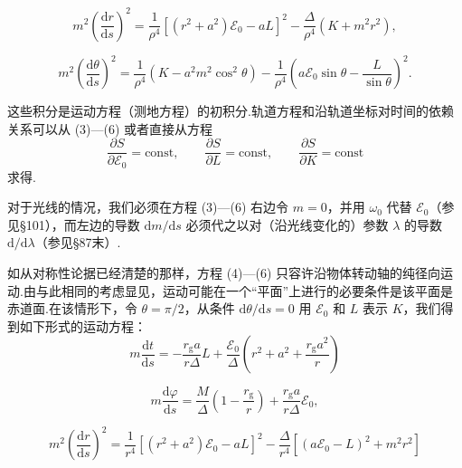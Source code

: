 \begin{xiti}
\begin{equation}
  m^{2}\left(\frac{\mathrm{d}r}{\mathrm{d}s}\right)^{2}
  =\frac{1}{\rho^{4}}
  \left[(r^{2}+a^{2})\mathcal{E}_0-aL\right]^{2}
  -\frac{\varDelta}{\rho^{4}}(K+m^{2}r^{2}),
  \tag{5}
\end{equation}

\begin{equation}
  m^{2}\left(\frac{\mathrm{d}\theta}{\mathrm{d}s}\right)^{2}
  =\frac{1}{\rho^{4}}(K-a^{2}m^{2}\cos^{2}\theta)
  -\frac{1}{\rho^{4}}
  \left(a\mathcal{E}_0\sin\theta-\frac{L}{\sin\theta}\right)^{2}.
  \tag{6}
\end{equation}

这些积分是运动方程（测地方程）的初积分.轨道方程和沿轨道坐标对时间的依赖关系可以从 (3)—(6) 或者直接从方程
\begin{equation*}
  \frac{\partial S}{\partial\mathcal{E}_0}=\mathrm{const},\qquad
  \frac{\partial S}{\partial L}=\mathrm{const},\qquad
  \frac{\partial S}{\partial K}=\mathrm{const}
\end{equation*}
求得.

对于光线的情况，我们必须在方程 (3)—(6) 右边令 $m=0$，并用 $\omega_0$ 代替 $\mathcal{E}_0$（参见§101），而左边的导数 $\mathrm{d}m/\mathrm{d}s$ 必须代之以对（沿光线变化的）参数 $\lambda$ 的导数 $\mathrm{d}/\mathrm{d}\lambda$（参见§87末）.

如从对称性论据已经清楚的那样，方程 (4)—(6) 只容许沿物体转动轴的纯径向运动.由与此相同的考虑显见，运动可能在一个“平面”上进行的必要条件是该平面是赤道面.在该情形下，令 $\theta=\pi/2$，从条件 $\mathrm{d}\theta/\mathrm{d}s=0$ 用 $\mathcal{E}_0$ 和 $L$ 表示 $K$，我们得到如下形式的运动方程：
\begin{equation}
  m\frac{\mathrm{d}t}{\mathrm{d}s}
  =-\frac{r_{\mathrm{g}}a}{r\varDelta}L
  +\frac{\mathcal{E}_0}{\varDelta}
  \left(r^{2}+a^{2}+\frac{r_{\mathrm{g}}a^{2}}{r}\right)
  \tag{7}
\end{equation}

\begin{equation}
  m\frac{\mathrm{d}\varphi}{\mathrm{d}s}
  =\frac{M}{\varDelta}\left(1-\frac{r_{\mathrm{g}}}{r}\right)
  +\frac{r_{\mathrm{g}}a}{r\varDelta}\mathcal{E}_0,
  \tag{8}
\end{equation}

\begin{equation}
  m^{2}\left(\frac{\mathrm{d}r}{\mathrm{d}s}\right)^{2}
  =\frac{1}{r^{4}}
  \left[(r^{2}+a^{2})\mathcal{E}_0-aL\right]^{2}
  -\frac{\varDelta}{r^{4}}
  \left[(a\mathcal{E}_0-L)^{2}+m^{2}r^{2}\right]
  \tag{9}
\end{equation}


\end{xiti}
